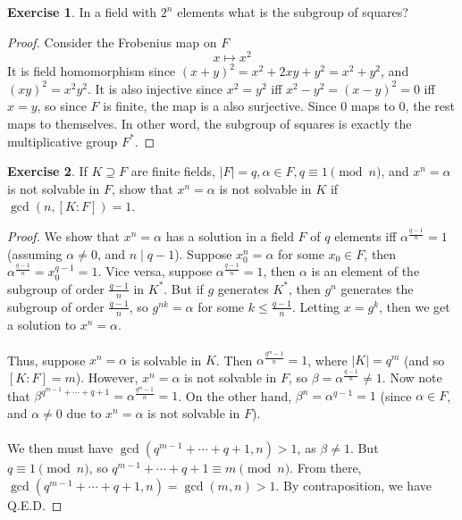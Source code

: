 \documentclass{article}
\theoremstyle{definition}
\newtheorem{exercise}{Exercise}
\begin{document}
\newpage

\begin{exercise}
In a field with $2^n$ elements what is the subgroup of squares?
\end{exercise}
\begin{proof}
Consider the Frobenius map on $F$
$$x \mapsto x^2$$
It is field homomorphism since $(x + y)^2 = x^2 + 2xy + y^2 = x^2 + y^2$, and $(xy)^2 = x^2 y^2$. It is also injective since $x^2 = y^2$ iff $x^2 - y^2 = (x - y)^2 = 0$ iff $x = y$, so since $F$ is finite, the map is a also surjective. Since $0$ maps to $0$, the rest maps to themselves. In other word, the subgroup of squares is exactly the multiplicative group $F^*$.
\end{proof}

\newpage

\begin{exercise}
If $K \supseteq F$ are finite fields, $|F| = q, \alpha \in F, q \equiv 1 \pmod{n}$, and $x^n = \alpha$ is not solvable in $F$, show that $x^n = \alpha$ is not solvable in $K$ if $\gcd(n, [K : F]) = 1$.
\end{exercise}
\begin{proof}
We show that $x^n = \alpha$ has a solution in a field $F$ of $q$ elements iff $\alpha^{\frac{q - 1}{n}} = 1$ (assuming $\alpha \neq 0$, and $n \mid q - 1$). Suppose $x_0^n = \alpha$ for some $x_0 \in F$, then $\alpha^{\frac{q - 1}{n}} = x_0^{q - 1} = 1$. Vice versa, suppose $\alpha^{\frac{q - 1}{n}} = 1$, then $\alpha$ is an element of the subgroup of order $\frac{q - 1}{n}$ in $K^*$. But if $g$ generates $K^*$, then $g^n$ generates the subgroup of order $\frac{q - 1}{n}$, so $g^{nk} = \alpha$ for some $k \leq \frac{q - 1}{n}$. Letting $x = g^k$, then we get a solution to $x^n = \alpha$.
\\
\\
Thus, suppose $x^n = \alpha$ is solvable in $K$. Then $\alpha^{\frac{q^m - 1}{n}} = 1$, where $|K| = q^m$ (and so $[K : F] = m$). However, $x^n = \alpha$ is not solvable in $F$, so $\beta = \alpha^{\frac{q - 1}{n}} \neq 1$. Now note that $\beta^{q^{m - 1} + \cdots + q + 1} = \alpha^{\frac{q^m - 1}{n}} = 1$. On the other hand, $\beta^n = \alpha^{q - 1} = 1$ (since $\alpha \in F$, and $\alpha \neq 0$ due to $x^n = \alpha$ is not solvable in $F$).
\\
\\
We then must have $\gcd(q^{m - 1} + \cdots + q + 1, n) > 1$, as $\beta \neq 1$. But $q \equiv 1 \pmod{n}$, so $q^{m - 1} + \cdots + q + 1 \equiv m \pmod{n}$. From there, $\gcd(q^{m - 1} + \cdots + q + 1, n) = \gcd(m, n) > 1$. By contraposition, we have Q.E.D.
\end{proof}
\end{document}
